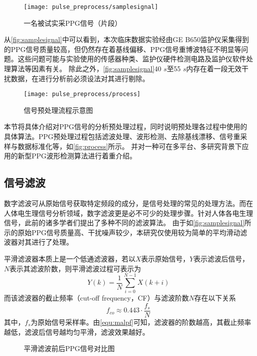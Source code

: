 \begin{figure}[htbp]
    \centering
    \texttt{[image: pulse\_preprocess/samplesignal]}
    \caption{\label{fig:samplesignal}一名被试实采PPG信号（片段）}
\end{figure}

从\autoref{fig:samplesignal}中可以看到，本次临床数据实验经由GE B650监护仪采集得到的PPG信号质量较高，但仍然存在着基线偏移、PPG信号重博波特征不明显等问题。这些问题可能与实验使用的传感器种类、监护仪硬件检测电路及监护仪软件处理算法等因素有关。
除此之外，\autoref{fig:samplesignal}40 $s$至55 $s$内存在着一段无效干扰数据，在进行分析前必须设法对其进行剔除。

\begin{figure}[htbp]
    \centering
    \texttt{[image: pulse\_preprocess/process]}
    \caption{\label{fig:process}信号预处理流程示意图}
\end{figure}

本节将具体介绍对PPG信号的分析预处理过程，同时说明预处理各过程中使用的具体算法。PPG预处理过程包括滤波处理、波形检测、去除基线漂移、信号重采样与数据标准化等，如\autoref{fig:process}所示。
并对一种可在多平台、多研究背景下应用的新型PPG波形检测算法进行着重介绍。
\subsection{信号滤波}
数字滤波可从原始信号获取特定频段的成分，是信号处理的常见的处理方法。而在人体电生理信号分析领域，数字滤波更是必不可少的处理步骤。针对人体各电生理信号，此前的诸多学者们提出了多种不同的滤波算法。
由于如\autoref{fig:samplesignal}所示的原始PPG信号质量高、干扰噪声较少，本研究仅使用较为简单的平均滑动滤波器对其进行了处理。

平滑滤波器本质上是一个低通滤波器，若以$X$表示原始信号，$Y$表示滤波后信号，$N$表示其滤波阶数，则平滑滤波过程可表示为
\begin{equation}
    \label{equ:filter}
    Y(k)=\frac{1}{N}\sum_{i=0}^{N-1}X(k+i)
\end{equation}
而该滤波器的截止频率（cut-off frequency，CF）与滤波阶数$N$存在以下关系\cite{malp2011,malp2022}
\begin{equation}
    \label{equ:malpf}
    f_{co} \approx 0.443 \cdot \frac{f_s}{N}    
\end{equation}
其中，$f_s$为原始信号采样率。由\autoref{equ:malpf}可知，滤波器的阶数越高，其截止频率越低，滤波后信号越均匀平滑，滤波效果越好。

\begin{figure}[htbp]
    \centering
    \quad
    \caption{\label{fig:filter}平滑滤波前后PPG信号对比图}
\end{figure}

